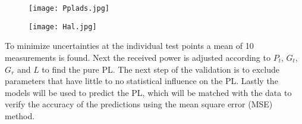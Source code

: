 










\begin{figure}[H]
\centering
\begin{minipage}{.23\textwidth}
  \centering
  \texttt{[image: Pplads.jpg]}
  \label{fig:test1}
\end{minipage}%
\hspace{2mm}
\begin{minipage}{.23\textwidth}
  \centering
  \texttt{[image: Hal.jpg]}
  \label{fig:test2}
\end{minipage}
\end{figure}

To minimize uncertainties at the individual test points a mean of 10 measurements is found. Next the received power is adjusted according to $P_t$, $G_t$, $G_r$ and $L$ to find the pure PL. The next step of the validation is to exclude parameters that have little to no statistical influence on the PL. Lastly the models will be used to predict the PL, which will be matched with the data to verify the accuracy of the predictions using the mean square error (MSE) method.  
